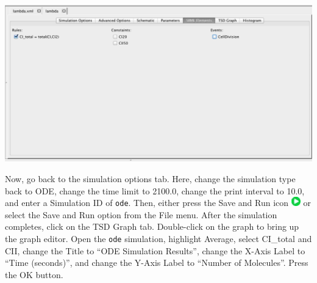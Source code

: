 \documentclass[titlepage,11pt]{article}
\begin{document}
\begin{center}
\includegraphics[width=160mm]{screenshots/SBMLElements}
\end{center}

Now, go back to the simulation options tab.  Here, change the simulation type back to ODE, change the time limit to 2100.0, change the print interval to 10.0, and enter a Simulation ID of {\tt ode}.  Then, either press the Save and Run icon \includegraphics{../gui/icons/run-icon} or select the Save and Run option from the File menu.
After the simulation completes, click on the TSD Graph tab.  Double-click on the graph to bring up the graph editor.
Open the {\tt ode} simulation, highlight Average, select CI\_total and CII, change the Title to ``ODE Simulation Results'', change the X-Axis Label to ``Time (seconds)'', and change the Y-Axis Label to ``Number of Molecules''.  
Press the OK button.  
\end{document}
